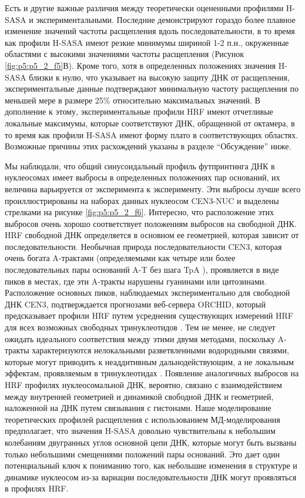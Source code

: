 Есть и другие важные различия между теоретически оцененными профилями H-SASA и экспериментальными. Последние демонстрируют гораздо более плавное изменение значений частоты расщепления вдоль последовательности, в то время как профили H-SASA имеют резкие минимумы шириной 1-2 п.н., окруженные областями с высокими значениями частоты расщепления (Рисунок \ref{fig:p5:p5_2_f5}В). Кроме того, хотя в определенных положениях значения H-SASA близки к нулю, что указывает на высокую защиту ДНК от расщепления, экспериментальные данные подтверждают минимальную частоту расщепления по меньшей мере в размере 25\% относительно максимальных значений. В дополнение к этому, экспериментальные профили HRF имеют отчетливые локальные максимумы, которые соответствуют ДНК, обращенной от октамера, в то время как профили H-SASA имеют форму плато в соответствующих областях. Возможные причины этих расхождений указаны в разделе ``Обсуждение'' ниже.

Мы наблюдали, что общий синусоидальный профиль футпринтинга ДНК в нуклеосомах имеет выбросы в определенных положениях пар оснований, их величина варьируется от эксперимента к эксперименту. Эти выбросы лучше всего проиллюстрированы на наборах данных нуклеосом CEN3-NUC и выделены стрелками на рисунке \ref{fig:p5:p5_2_f6}. Интересно, что расположение этих выбросов очень хорошо соответствует положениям выбросов на свободной ДНК. HRF свободной ДНК определяется в основном ее геометрией, которая зависит от последовательности. Необычная природа последовательности CEN3, которая очень богата A-трактами (определяемыми как четыре или более последовательных пары оснований A-T без шага TpA \cite{stefl_dna_2004}), проявляется в виде пиков в местах, где эти A-тракты нарушены гуанинами или цитозинами. Расположение основных пиков, наблюдаемых экспериментально для свободной ДНК CEN3, подтверждается прогнозами веб-сервера ORCHID, который предсказывает профили HRF путем усреднения существующих измерений HRF для всех возможных свободных тринуклеотидов \cite{greenbaum_construction_2007}. Тем не менее, не следует ожидать идеального соответствия между этими двумя методами, поскольку A-тракты характеризуются нелокальными разветвленными водородными связями, которые могут приводить к неаддитивным дальнодействующим, а не локальным эффектам, проявляемым в тринуклеотидах \cite{haran_unique_2009}. Появление аналогичных выбросов на HRF профилях нуклеосомальной ДНК, вероятно, связано с взаимодействием между внутренней геометрией и динамикой свободной ДНК и геометрией, наложенной на ДНК путем связывания с гистонами. Наше моделирование теоретических профилей расщепления с использованием МД-моделирования предполагает, что значения H-SASA довольно чувствительны к небольшим колебаниям двугранных углов основной цепи ДНК, которые могут быть вызваны только небольшими смещениями положений пары оснований. Это дает один потенциальный ключ к пониманию того, как небольшие изменения в структуре и динамике нуклеосом из-за вариации последовательности ДНК могут проявляться в профилях HRF.


